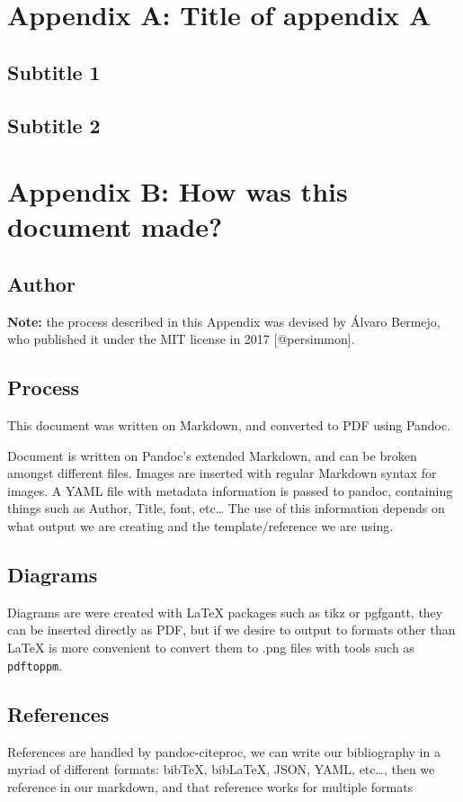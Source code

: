 \chapter{Appendix A: Title of appendix
A}\label{appendix-a-title-of-appendix-a}

\section{Subtitle 1}\label{subtitle-1}

\section{Subtitle 2}\label{subtitle-2}

\chapter{Appendix B: How was this document
made?}\label{appendix-b-how-was-this-document-made}

\section{Author}\label{author}

\textbf{Note:} the process described in this Appendix was devised by
Álvaro Bermejo, who published it under the MIT license in 2017
{[}@persimmon{]}.

\section{Process}\label{process}

This document was written on Markdown, and converted to PDF using
Pandoc.

Document is written on Pandoc’s extended Markdown, and can be broken
amongst different files. Images are inserted with regular Markdown
syntax for images. A YAML file with metadata information is passed to
pandoc, containing things such as Author, Title, font, etc\ldots{} The
use of this information depends on what output we are creating and the
template/reference we are using.

\section{Diagrams}\label{diagrams}

Diagrams are were created with LaTeX packages such as tikz or pgfgantt,
they can be inserted directly as PDF, but if we desire to output to
formats other than LaTeX is more convenient to convert them to .png
files with tools such as \texttt{pdftoppm}.

\section{References}\label{references}

References are handled by pandoc-citeproc, we can write our bibliography
in a myriad of different formats: bibTeX, bibLaTeX, JSON, YAML,
etc\ldots{}, then we reference in our markdown, and that reference works
for multiple formats
